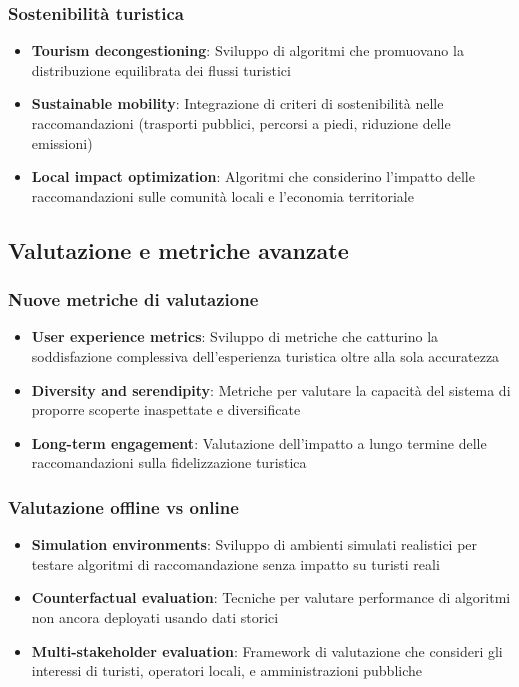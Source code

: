 \subsubsection{Sostenibilità turistica}
\begin{itemize}
\item \textbf{Tourism decongestioning}: Sviluppo di algoritmi che promuovano la distribuzione equilibrata dei flussi turistici
\item \textbf{Sustainable mobility}: Integrazione di criteri di sostenibilità nelle raccomandazioni (trasporti pubblici, percorsi a piedi, riduzione delle emissioni)
\item \textbf{Local impact optimization}: Algoritmi che considerino l'impatto delle raccomandazioni sulle comunità locali e l'economia territoriale
\end{itemize}

\subsection{Valutazione e metriche avanzate}

\subsubsection{Nuove metriche di valutazione}
\begin{itemize}
\item \textbf{User experience metrics}: Sviluppo di metriche che catturino la soddisfazione complessiva dell'esperienza turistica oltre alla sola accuratezza
\item \textbf{Diversity and serendipity}: Metriche per valutare la capacità del sistema di proporre scoperte inaspettate e diversificate
\item \textbf{Long-term engagement}: Valutazione dell'impatto a lungo termine delle raccomandazioni sulla fidelizzazione turistica
\end{itemize}

\subsubsection{Valutazione offline vs online}
\begin{itemize}
\item \textbf{Simulation environments}: Sviluppo di ambienti simulati realistici per testare algoritmi di raccomandazione senza impatto su turisti reali
\item \textbf{Counterfactual evaluation}: Tecniche per valutare performance di algoritmi non ancora deployati usando dati storici
\item \textbf{Multi-stakeholder evaluation}: Framework di valutazione che consideri gli interessi di turisti, operatori locali, e amministrazioni pubbliche
\end{itemize}

